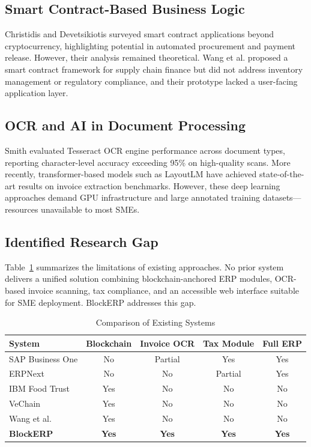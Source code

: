 \documentclass[conference]{IEEEtran}
\begin{document}
\subsection{Smart Contract-Based Business Logic}
Christidis and Devetsikiotis \cite{b10} surveyed smart contract applications beyond cryptocurrency, highlighting potential in automated procurement and payment release. However, their analysis remained theoretical. Wang et al. \cite{b11} proposed a smart contract framework for supply chain finance but did not address inventory management or regulatory compliance, and their prototype lacked a user-facing application layer.

\subsection{OCR and AI in Document Processing}
Smith \cite{b12} evaluated Tesseract OCR engine performance across document types, reporting character-level accuracy exceeding 95\% on high-quality scans. More recently, transformer-based models such as LayoutLM \cite{b13} have achieved state-of-the-art results on invoice extraction benchmarks. However, these deep learning approaches demand GPU infrastructure and large annotated training datasets—resources unavailable to most SMEs.

\subsection{Identified Research Gap}
Table~\ref{tab_comparison} summarizes the limitations of existing approaches. No prior system delivers a unified solution combining blockchain-anchored ERP modules, OCR-based invoice scanning, tax compliance, and an accessible web interface suitable for SME deployment. BlockERP addresses this gap.

\begin{table}[htbp]
\caption{Comparison of Existing Systems}
\begin{center}
\renewcommand{\arraystretch}{1.2}
\begin{tabular}{|p{1.8cm}|c|c|c|c|}
\hline
\textbf{System} & \textbf{Blockchain} & \textbf{Invoice OCR} & \textbf{Tax Module} & \textbf{Full ERP} \\
\hline
SAP Business One & No & Partial & Yes & Yes \\
\hline
ERPNext & No & No & Partial & Yes \\
\hline
IBM Food Trust & Yes & No & No & No \\
\hline
VeChain & Yes & No & No & No \\
\hline
Wang et al. \cite{b11} & Yes & No & No & No \\
\hline
\textbf{BlockERP} & \textbf{Yes} & \textbf{Yes} & \textbf{Yes} & \textbf{Yes} \\
\hline
\end{tabular}
\label{tab_comparison}
\end{center}
\end{table}
\end{document}
